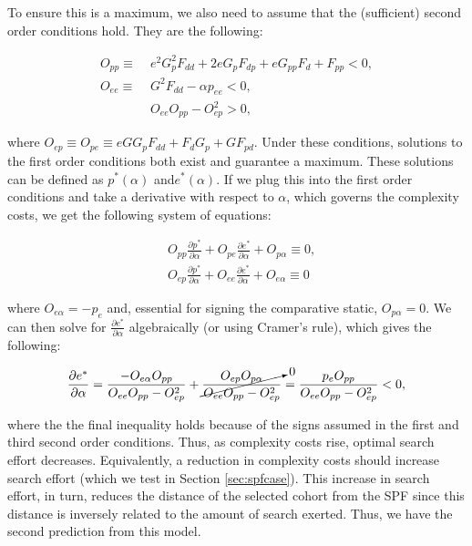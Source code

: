 To ensure this is a maximum, we also need to assume that the (sufficient) second order conditions hold. They are the following:

\begin{align}
O_{pp} \equiv &\;  e^2G_p^2F_{dd} + 2eG_pF_{dp} + eG_{pp}F_d + F_{pp} < 0, \nonumber \\
O_{ee}  \equiv &\;  G^2F_{dd} - \alpha p_{ee} < 0, \nonumber \\
&  \; O_{ee}O_{pp} - O_{ep}^2 > 0, \nonumber
\end{align}

\noindent where $O_{ep} \equiv O_{pe} \equiv eGG_pF_{dd} + F_dG_p + GF_{pd}$. Under these conditions, solutions to the first order conditions both exist and guarantee a maximum. These solutions can be defined as $p^*(\alpha)$ and$e^*(\alpha)$. If we plug this into the first order conditions and take a derivative with respect to $\alpha$, which governs the complexity costs, we get the following system of equations:

\begin{align}
& O_{pp}\frac{\partial p^*}{\partial \alpha} + O_{pe}\frac{\partial e^*}{\partial \alpha} + O_{p\alpha} \equiv 0, \nonumber \\
& O_{ep}\frac{\partial p^*}{\partial \alpha} + O_{ee}\frac{\partial e^*}{\partial \alpha} + O_{e\alpha} \equiv 0  \nonumber
\end{align}

\noindent where $O_{e\alpha} = -p_e$ and, essential for signing the comparative static, $O_{p\alpha} = 0$. We can then solve for $\frac{\partial e^*}{\partial \alpha}$ algebraically (or using Cramer's rule), which gives the following:

\begin{equation}
\frac{\partial e^*}{\partial \alpha} = \frac{-O_{e\alpha}O_{pp}}{O_{ee}O_{pp} - O_{ep}^2} + \cancelto{0}{\frac{O_{ep}O_{p\alpha}}{O_{ee}O_{pp} - O_{ep}^2}} = \frac{p_eO_{pp}}{O_{ee}O_{pp} - O_{ep}^2} < 0, \label{eq:comp_stat}
\end{equation}

\noindent where the the final inequality holds because of the signs assumed in the first and third second order conditions.  Thus, as complexity costs rise, optimal search effort decreases. Equivalently, a reduction in complexity costs should increase search effort (which we test in Section \ref{sec:spfcase}). This increase in search effort, in turn, reduces the distance of the selected cohort from the SPF since this distance is inversely related to the amount of search exerted. Thus, we have the second prediction from this model. \\

